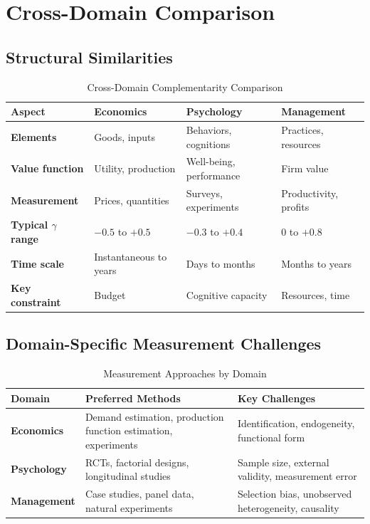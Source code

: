 \section{Cross-Domain Comparison}
\label{sec:comparison}

\subsection{Structural Similarities}

\begin{table}[h]
\centering
\caption{Cross-Domain Complementarity Comparison}
\label{tab:cross-domain}
\renewcommand{\arraystretch}{1.3}
\small
\begin{tabular}{@{}p{2.5cm}p{3.5cm}p{3.5cm}p{3.5cm}@{}}
\toprule
\textbf{Aspect} & \textbf{Economics} & \textbf{Psychology} & \textbf{Management} \\
\midrule
\textbf{Elements} & Goods, inputs & Behaviors, cognitions & Practices, resources \\
\textbf{Value function} & Utility, production & Well-being, performance & Firm value \\
\textbf{Measurement} & Prices, quantities & Surveys, experiments & Productivity, profits \\
\textbf{Typical $\gamma$ range} & $-0.5$ to $+0.5$ & $-0.3$ to $+0.4$ & $0$ to $+0.8$ \\
\textbf{Time scale} & Instantaneous to years & Days to months & Months to years \\
\textbf{Key constraint} & Budget & Cognitive capacity & Resources, time \\
\bottomrule
\end{tabular}
\end{table}

\subsection{Domain-Specific Measurement Challenges}

\begin{table}[h]
\centering
\caption{Measurement Approaches by Domain}
\label{tab:measurement}
\renewcommand{\arraystretch}{1.3}
\small
\begin{tabular}{@{}p{2.5cm}p{4.5cm}p{5cm}@{}}
\toprule
\textbf{Domain} & \textbf{Preferred Methods} & \textbf{Key Challenges} \\
\midrule
\textbf{Economics} & Demand estimation, production function estimation, experiments & Identification, endogeneity, functional form \\
\textbf{Psychology} & RCTs, factorial designs, longitudinal studies & Sample size, external validity, measurement error \\
\textbf{Management} & Case studies, panel data, natural experiments & Selection bias, unobserved heterogeneity, causality \\
\bottomrule
\end{tabular}
\end{table}

